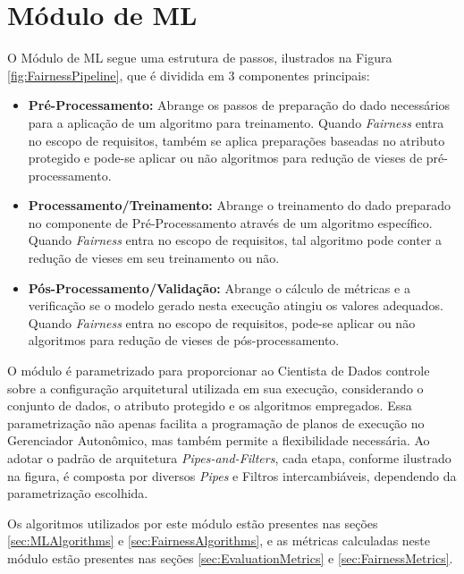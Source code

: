 \documentclass[portugues]{ic-tese}
\begin{document}
\section{Módulo de ML}
\label{sec:ModuloML}

O Módulo de ML segue uma estrutura de passos, ilustrados na Figura \ref{fig:FairnessPipeline}, que é dividida em 3 componentes principais:

\begin{itemize}
	\item \textbf{Pré-Processamento:} Abrange os passos de preparação do dado necessários para a aplicação de um algoritmo para treinamento. Quando \textit{Fairness} entra no escopo de requisitos, também se aplica preparações baseadas no atributo protegido e pode-se aplicar ou não algoritmos para redução de vieses de pré-processamento.
	\item \textbf{Processamento/Treinamento:} Abrange o treinamento do dado preparado no componente de Pré-Processamento através de um algoritmo específico. Quando \textit{Fairness} entra no escopo de requisitos, tal algoritmo pode conter a redução de vieses em seu treinamento ou não.
	\item \textbf{Pós-Processamento/Validação:} Abrange o cálculo de métricas e a verificação se o modelo gerado nesta execução atingiu os valores adequados. Quando \textit{Fairness} entra no escopo de requisitos, pode-se aplicar ou não algoritmos para redução de vieses de pós-processamento.
\end{itemize}

O módulo é parametrizado para proporcionar ao Cientista de Dados controle sobre a configuração arquitetural utilizada em sua execução, considerando o conjunto de dados, o atributo protegido e os algoritmos empregados. Essa parametrização não apenas facilita a programação de planos de execução no Gerenciador Autonômico, mas também permite a flexibilidade necessária. Ao adotar o padrão de arquitetura \textit{Pipes-and-Filters}, cada etapa, conforme ilustrado na figura, é composta por diversos \textit{Pipes} e Filtros intercambiáveis, dependendo da parametrização escolhida.

Os algoritmos utilizados por este módulo estão presentes nas seções \ref{sec:MLAlgorithms} e \ref{sec:FairnessAlgorithms}, e as métricas calculadas neste módulo estão presentes nas seções \ref{sec:EvaluationMetrics} e \ref{sec:FairnessMetrics}.
\end{document}
